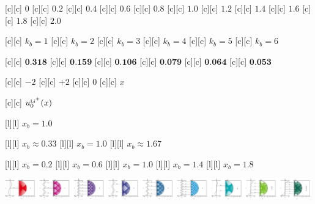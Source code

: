  [c][c] {\tiny $0$}
 [c][c] {\tiny $0.2$}
 [c][c] {\tiny $0.4$}
 [c][c] {\tiny $0.6$}
 [c][c] {\tiny $0.8$}
[c][c] {\tiny $1.0$}
[c][c] {\tiny $1.2$}
[c][c] {\tiny $1.4$}
[c][c] {\tiny $1.6$}
[c][c] {\tiny $1.8$}
[c][c] {\tiny $2.0$}



[c][c] {$k_{b} = 1$}
[c][c] {$k_{b} = 2$}
[c][c] {$k_{b} = 3$}
[c][c] {$k_{b} = 4$}
[c][c] {$k_{b} = 5$}
[c][c] {$k_{b} = 6$}

[c][c] {\tiny $\textbf{0.318}$}
[c][c] {\tiny $\textbf{0.159}$}
[c][c] {\tiny $\textbf{0.106}$}
[c][c] {\tiny $\textbf{0.079}$}
[c][c] {\tiny $\textbf{0.064}$}
[c][c] {\tiny $\textbf{0.053}$}

[c][c] {\tiny $-2$}
[c][c] {\tiny $+2$}
[c][c]   {\tiny $0$}
[c][c]   {\tiny $x$}

[c][c]  {\tiny $u_{0}^{\text{\tiny Li}^{\tiny +}}(x)$}

[l][l] {\tiny $x_{b} = 1.0$}

[l][l] {\tiny $x_{b} \approx 0.33$}
[l][l] {\tiny $x_{b} = 1.0$}
[l][l] {\tiny $x_{b} \approx 1.67$}

[l][l] {\tiny $x_{b} = 0.2$}
[l][l] {\tiny $x_{b} = 0.6$}
[l][l] {\tiny $x_{b} = 1.0$}
[l][l] {\tiny $x_{b} = 1.4$}
[l][l] {\tiny $x_{b} = 1.8$}

\includegraphics[width=0.99\textwidth]{characsin_rotate_semicircle_135246mix_horizontal.eps}